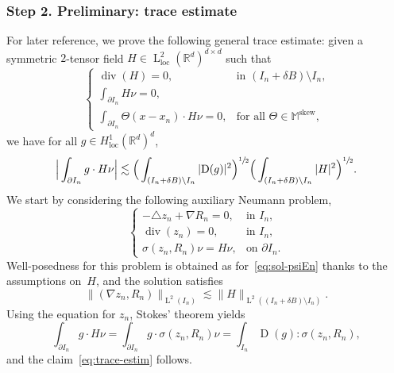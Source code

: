 \documentclass[10pt]{amsart}
\newcounter{assumption}
\theoremstyle{plain}
\theoremstyle{definition}
\newcommand{\R}{\mathbb R}
\newcommand{\Md}{\mathbb M}
\newcommand{\loc}{{\operatorname{loc}}}
\newcommand{\D}{\operatorname{D}}
\newcommand{\Ld}{\operatorname{L}}
\newcommand{\Div}{{\operatorname{div}}}
\newcommand{\Skew}{{\operatorname{skew}}}
\newcommand{\step}[1]{\subsubsection*{Step #1}}
\begin{document}
\step{2. Preliminary: trace estimate}
For later reference, we prove the following general trace estimate: given a symmetric $2$-tensor field $H\in \Ld^2_\loc(\R^d)^{d\times d}$ such that
\[
\begin{cases}
\Div(H)=0,&\text{in $(I_n+\delta B)\setminus I_n$,}\\
\int_{\partial I_n}H\nu=0,&\\
\int_{\partial I_n}\Theta(x-x_n)\cdot H\nu=0,&\text{for all $\Theta\in\Md^\Skew$},
\end{cases}\]
we have for all $g\in H^1_\loc(\R^d)^d$,
\begin{equation}\label{eq:trace-estim}
\Big|\int_{\partial I_n}g\cdot H\nu\Big|\lesssim \Big(\int_{(I_n+\delta B)\setminus I_n}|\!\D(g)|^2\Big)^{\sfrac12}\Big(\int_{(I_n+\delta B)\setminus I_n}|H|^2\Big)^{\sfrac12}.
\end{equation}
We start by considering the following auxiliary Neumann problem,
\[
\begin{cases}
-\triangle z_n+\nabla R_n=0,&\text{in $I_n$},\\
\Div(z_n)=0,&\text{in $I_n$},\\
\sigma(z_n,R_n)\nu=H\nu,&\text{on $\partial I_n$}.
\end{cases}\]
Well-posedness for this problem is obtained as for~\eqref{eq:sol-psiEn} thanks to the assumptions on~$H$, and the solution satisfies
\[\|(\nabla z_n,R_n)\|_{\Ld^2(I_n)}\lesssim \|H\|_{\Ld^2((I_n+\delta B)\setminus I_n)}.\]
Using the equation for $z_n$, Stokes' theorem yields
\[\int_{\partial I_n}g\cdot H\nu=\int_{\partial I_n}g\cdot \sigma(z_n,R_n)\nu=\int_{I_n}\D(g): \sigma(z_n,R_n),\]
and the claim~\eqref{eq:trace-estim} follows.
\end{document}
